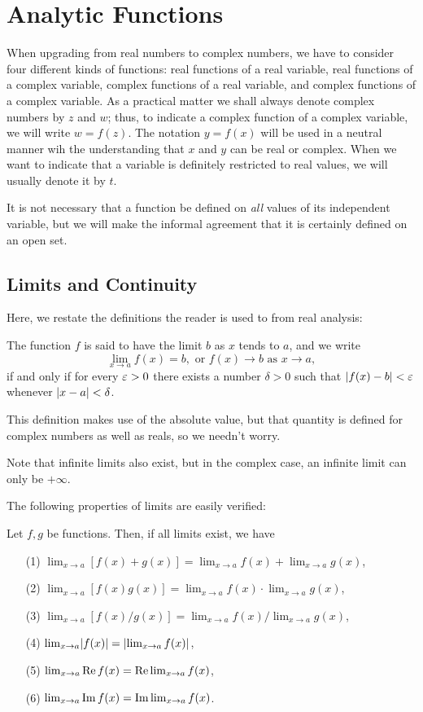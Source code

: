 \chapter{Analytic Functions}
\label{chap:analytic-functions}
When upgrading from real numbers to complex numbers, we have to consider four different kinds of functions: real functions of a real variable, real functions of a complex variable, complex functions of a real variable, and complex functions of a complex variable. As a practical matter we shall always denote complex numbers by $z$ and $w$; thus, to indicate a complex function of a complex variable, we will write $w=f(z)$. The notation $y=f(x)$ will be used in a neutral manner wih the understanding that $x$ and $y$ can be real or complex. When we want to indicate that a variable is definitely restricted to real values, we will usually denote it by $t$.

It is not necessary that a function be defined on \textit{all} values of its independent variable, but we will make the informal agreement that it is certainly defined on an open set.

\section{Limits and Continuity}
Here, we restate the definitions the reader is used to from real analysis:
\begin{definition}[Limit]
	The function $f$ is said to have the limit $b$ as $x$ tends to $a$, and we write $$\lim_{x \rightarrow a}f(x)=b, \text{ or } f(x) \rightarrow b \text{ as } x \rightarrow a,$$ if and only if for every $\varepsilon>0$ there exists a number $\delta>0$ such that $\lvert f(x)-b \rvert<\varepsilon$ whenever $\lvert x-a \rvert<\delta$.
\end{definition}
This definition makes use of the absolute value, but that quantity is defined for complex numbers as well as reals, so we needn't worry.

Note that infinite limits also exist, but in the complex case, an infinite limit can only be $+\infty$.

The following properties of limits are easily verified:
\begin{proposition}
	Let $f,g$ be functions. Then, if all limits exist, we have
	\begin{enumerate}
		\item[(1)] $\lim_{x \rightarrow a}\left[f(x)+g(x)\right]=\lim_{x \rightarrow a}f(x)+\lim_{x \rightarrow a}g(x)$,
		\item[(2)] $\lim_{x \rightarrow a}\left[f(x)g(x)\right]=\lim_{x \rightarrow a}f(x) \cdot \lim_{x \rightarrow a}g(x)$,
		\item[(3)] $\lim_{x \rightarrow a}\left[f(x)/g(x)\right]=\lim_{x \rightarrow a}f(x)/\lim_{x \rightarrow a}g(x)$,
		\item[(4)] $\lim_{x \rightarrow a}\lvert f(x) \rvert=\lvert \lim_{x \rightarrow a}f(x) \rvert$,
		\item[(5)] $\lim_{x \rightarrow a} \operatorname{Re} f(x)=\operatorname{Re} \lim_{x \rightarrow a} f(x)$,
		\item[(6)] $\lim_{x \rightarrow a} \operatorname{Im} f(x)=\operatorname{Im} \lim_{x \rightarrow a} f(x)$.
	\end{enumerate}
\end{proposition}

